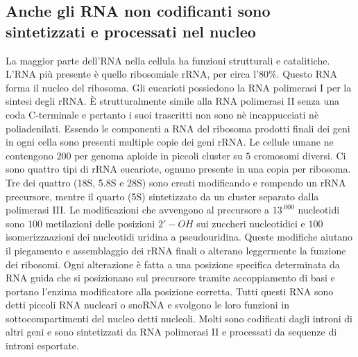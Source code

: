 \subsection{Anche gli RNA non codificanti sono sintetizzati e processati nel nucleo}
La maggior parte dell'RNA nella cellula ha funzioni strutturali e catalitiche. L'RNA pi\`u presente \`e quello ribosomiale rRNA, per circa l'$80\%$. Questo RNA forma il nucleo del
ribosoma. Gli eucarioti possiedono la RNA polimerasi I per la sintesi degli rRNA. \`E strutturalmente simile alla RNA polimerasi II senza una coda C-terminale e pertanto i suoi 
trascritti non sono n\`e incappucciati n\`e poliadenilati. Essendo le componenti a RNA del ribosoma prodotti finali dei geni in ogni cella sono presenti multiple copie dei geni rRNA. Le
cellule umane ne contengono $200$ per genoma aploide in piccoli cluster su $5$ cromosomi diversi. Ci sono quattro tipi di rRNA eucariote, ognuno presente in una copia per ribosoma. Tre
dei quattro (18S, 5.8S e 28S) sono creati modificando e rompendo un rRNA precursore, mentre il quarto (5S) sintetizzato da un cluster separato dalla polimerasi III. Le modificazioni
che avvengono al precursore a $13^.000$ nucleotidi sono $100$ metilazioni delle posizioni $2'-OH$ sui zuccheri nucleotidici e $100$ isomerizzaazioni dei nucleotidi uridina a 
pseudouridina. Queste modifiche aiutano il piegamento e assemblaggio dei rRNA finali o alterano leggermente la funzione dei ribosomi. Ogni alterazione \`e fatta a una posizione specifica
determinata da RNA guida che si posizionano sul precursore tramite accoppiamento di basi e portano l'enzima modificatore alla posizione corretta. Tutti questi RNA sono detti piccoli RNA 
nucleari o snoRNA e svolgono le loro funzioni in sottocompartimenti del nucleo detti nucleoli. Molti sono codificati dagli introni di altri geni e sono sintetizzati da RNA polimerasi II
e processati da sequenze di introni esportate.
